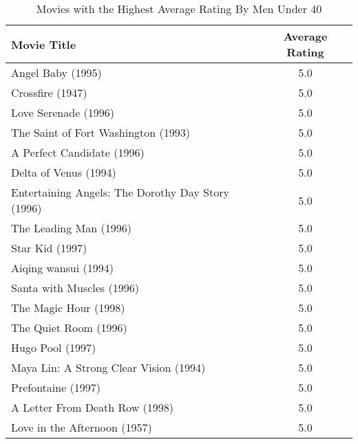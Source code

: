 \documentclass{article}
\begin{document}
\begin{table}[!h]
\centering
\begin{tabular}{l c}
Movie Title & Average Rating \\
\hline
Angel Baby (1995) & 5.0 \\
Crossfire (1947) & 5.0 \\
Love Serenade (1996) & 5.0 \\
The Saint of Fort Washington (1993) & 5.0 \\
A Perfect Candidate (1996) & 5.0 \\
Delta of Venus (1994) & 5.0 \\
Entertaining Angels: The Dorothy Day Story (1996) & 5.0 \\
The Leading Man (1996) & 5.0 \\
Star Kid (1997) & 5.0 \\
Aiqing wansui (1994) & 5.0 \\
Santa with Muscles (1996) & 5.0 \\
The Magic Hour (1998) & 5.0 \\
The Quiet Room (1996) & 5.0 \\
Hugo Pool (1997) & 5.0 \\
Maya Lin: A Strong Clear Vision (1994) & 5.0 \\
Prefontaine (1997) & 5.0 \\
A Letter From Death Row (1998) & 5.0 \\
Love in the Afternoon (1957) & 5.0 \\
\hline
\end{tabular}
\caption{Movies with the Highest Average Rating By Men Under 40}
\end{table}
\end{document}
